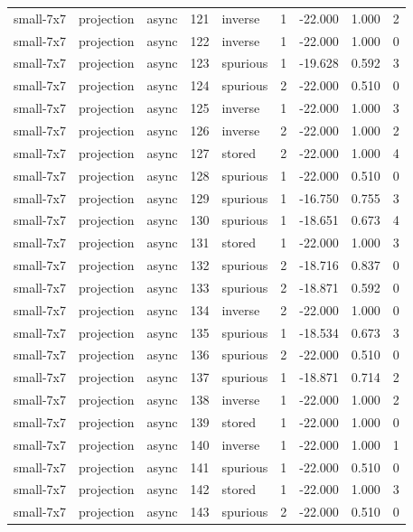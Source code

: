 \begin{tabular}{lllrlrrrr}
small-7x7 & projection & async & 121 & inverse & 1 & -22.000 & 1.000 & 2 \\
small-7x7 & projection & async & 122 & inverse & 1 & -22.000 & 1.000 & 0 \\
small-7x7 & projection & async & 123 & spurious & 1 & -19.628 & 0.592 & 3 \\
small-7x7 & projection & async & 124 & spurious & 2 & -22.000 & 0.510 & 0 \\
small-7x7 & projection & async & 125 & inverse & 1 & -22.000 & 1.000 & 3 \\
small-7x7 & projection & async & 126 & inverse & 2 & -22.000 & 1.000 & 2 \\
small-7x7 & projection & async & 127 & stored & 2 & -22.000 & 1.000 & 4 \\
small-7x7 & projection & async & 128 & spurious & 1 & -22.000 & 0.510 & 0 \\
small-7x7 & projection & async & 129 & spurious & 1 & -16.750 & 0.755 & 3 \\
small-7x7 & projection & async & 130 & spurious & 1 & -18.651 & 0.673 & 4 \\
small-7x7 & projection & async & 131 & stored & 1 & -22.000 & 1.000 & 3 \\
small-7x7 & projection & async & 132 & spurious & 2 & -18.716 & 0.837 & 0 \\
small-7x7 & projection & async & 133 & spurious & 2 & -18.871 & 0.592 & 0 \\
small-7x7 & projection & async & 134 & inverse & 2 & -22.000 & 1.000 & 0 \\
small-7x7 & projection & async & 135 & spurious & 1 & -18.534 & 0.673 & 3 \\
small-7x7 & projection & async & 136 & spurious & 2 & -22.000 & 0.510 & 0 \\
small-7x7 & projection & async & 137 & spurious & 1 & -18.871 & 0.714 & 2 \\
small-7x7 & projection & async & 138 & inverse & 1 & -22.000 & 1.000 & 2 \\
small-7x7 & projection & async & 139 & stored & 1 & -22.000 & 1.000 & 0 \\
small-7x7 & projection & async & 140 & inverse & 1 & -22.000 & 1.000 & 1 \\
small-7x7 & projection & async & 141 & spurious & 1 & -22.000 & 0.510 & 0 \\
small-7x7 & projection & async & 142 & stored & 1 & -22.000 & 1.000 & 3 \\
small-7x7 & projection & async & 143 & spurious & 2 & -22.000 & 0.510 & 0 \\

\end{tabular}
